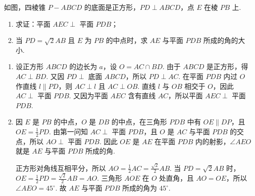 \begin{problem}
如图，四棱锥 \(P - ABCD\) 的底面是正方形，\(PD \perp ABCD\)，点 \(E\) 在棱 \(PB\) 上.
\begin{enumerate}
\item 求证：平面 \( AEC \perp \) 平面 \(PDB\)；
\item 当 \(PD = \sqrt{2} AB\) 且 \(E\) 为 \(PB\) 的中点时，求 \(AE\) 与平面 \(PDB\) 所成的角的大小.
\end{enumerate}


\begin{solution}
\begin{enumerate}
\item 设正方形 \(ABCD\) 的边长为 \(a\)，设 \(O=AC\cap BD\). 由于 \(ABCD\) 是正方形，得 \(AC\perp BD\).
又因 \(PD\perp\) 底面 \(ABCD\)，所以 \(PD\perp AC\).
在平面 \(PDB\) 内过 \(O\) 作直线 \(l\parallel PD\)，则 \(AC\perp l\) 且 \(AC\perp OB\).
直线 \(l\) 与 \(OB\) 相交于 \(O\)，因此 \(AC\perp\) 平面 \(PDB\).
又因为平面 \(AEC\) 含有直线 \(AC\)，所以平面 \(AEC\perp\) 平面 \(PDB\).

\item 因 \(E\) 是 \(PB\) 的中点，\(O\) 是 \(DB\) 的中点，在三角形 \(PDB\) 中有 \(OE\parallel DP\)，且 \(OE=\frac{1}{2}PD\).
由第一问知 \(AC\perp\) 平面 \(PDB\)，且 \(O\) 是 \(AC\) 与平面 \(PDB\) 的交点，所以 \(AO\perp\) 平面 \(PDB\).
因此 \(OE\) 是 \(AE\) 在平面 \(PDB\) 内的射影，\(\angle AEO\) 就是 \(AE\) 与平面 \(PDB\) 所成的角.

正方形对角线互相平分，所以 \(AO=\frac{1}{2}AC=\frac{\sqrt{2}}{2}AB\).
当 \(PD=\sqrt{2}AB\) 时，\(OE=\frac{1}{2}PD=\frac{\sqrt{2}}{2}AB=AO\).
三角形 \(AOE\) 在 \(O\) 处直角，且 \(AO=OE\)，所以 \(\angle AEO=45^{\circ}\).
故 \(AE\) 与平面 \(PDB\) 所成的角为 \(45^{\circ}\).
\end{enumerate}
\end{solution}
\end{problem}

